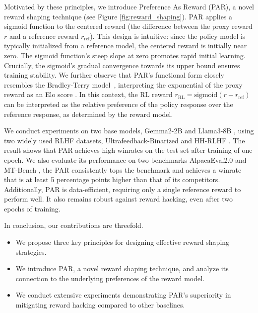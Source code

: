 Motivated by these principles, we introduce Preference As Reward (PAR), a novel reward shaping technique (see Figure \ref{fig:reward_shaping}). PAR applies a sigmoid function to the centered reward (the difference between the proxy reward $r$ and a reference reward $r_{\text{ref}}$). This design is intuitive: since the policy model is typically initialized from a reference model, the centered reward is initially near zero. The sigmoid function's steep slope at zero promotes rapid initial learning. Crucially, the sigmoid's gradual convergence towards its upper bound ensures training stability. We further observe that PAR's functional form closely resembles the Bradley-Terry model~\cite{Bradley_Terry}, interpreting the exponential of the proxy reward as an Elo score \cite{Elo_1978}. In this context, the RL reward \(r_{\text{RL}}=\text{sigmoid}(r-r_{\text{ref}})\) can be interpreted as the relative preference of the policy response over the reference response, as determined by the reward model.

We conduct experiments on two base models, Gemma2-2B \citep{gemma_2024} and Llama3-8B \citep{llama3modelcard}, using two widely used RLHF datasets, Ultrafeedback-Binarized \citep{cui2023ultrafeedback} and HH-RLHF \citep{bai2022traininghelpfulharmlessassistant}. The result shows that PAR achieves high winrates on the test set after training of one epoch. We also evaluate its performance on two benchmarks AlpacaEval2.0 \citep{alpaca_eval} and MT-Bench \citep{zheng2023judgingllmasajudgemtbenchchatbot}, the PAR consistently tops the benchmark and achieves a winrate that is at least 5 percentage points higher than that of its competitors. Additionally, PAR is data-efficient, requiring only a single reference reward to perform well. It also remains robust against reward hacking, even after two epochs of training.

In conclusion, our contributions are threefold.
\begin{itemize}[leftmargin=*, itemsep=0pt]
\item We propose three key principles for designing effective reward shaping strategies.
\item We introduce PAR, a novel reward shaping technique, and analyze its connection to the underlying preferences of the reward model. 
\item We conduct extensive experiments demonstrating PAR's superiority in mitigating reward hacking compared to other baselines.
\end{itemize}